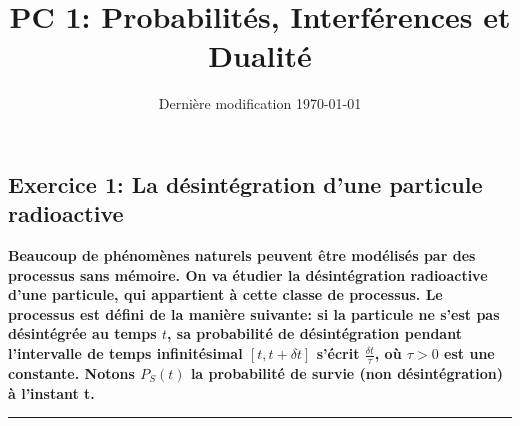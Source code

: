 \documentclass[french]{article}
\begin{document}
	
	\title{PC 1: Probabilités, Interférences et Dualité}
	\date{Dernière modification \today}
	
	\maketitle
	
	\subsection*{Exercice 1: La désintégration d'une particule radioactive}
	\textbf{Beaucoup de phénomènes naturels peuvent être modélisés par des processus sans mémoire. On va étudier la désintégration radioactive d'une particule, qui appartient à cette classe de processus. Le processus est défini de la manière suivante: si la particule ne s'est pas désintégrée au temps $t$, sa probabilité de désintégration pendant l'intervalle de temps infinitésimal $[t, t + \delta t]$ s'écrit $\frac{\delta t}{\tau}$, où $\tau > 0$ est une constante. Notons $P_S(t)$ la probabilité de survie (non désintégration) à l'instant t.
	}
	\vspace{.3cm}
	\hrule
	\vspace{.3cm}
\end{document}
